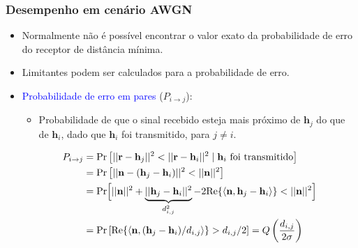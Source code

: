 \begin{frame}
	\frametitle{Desempenho em cenário AWGN}

	\begin{itemize}
	    \item Normalmente não é possível encontrar o valor exato da probabilidade de erro do receptor de distância mínima.
	    \item Limitantes podem ser calculados para a probabilidade de erro.
	    \item \textcolor{blue}{Probabilidade de erro em pares} ($P_{i\rightarrow j}$):
	    \begin{itemize}
		\item Probabilidade de que o sinal recebido esteja mais próximo de $\mathbf{h}_j$ do que de $\mathbf{h}_i$, dado que $\mathbf{h}_i$ foi transmitido, para $j\neq i$.
	    \end{itemize}
	    \begin{align*}
		P_{i\rightarrow j} &= \mathrm{Pr}\left[ || \mathbf{r} - \mathbf{h}_j ||^2 < || \mathbf{r} - \mathbf{h}_i ||^2 \mid \mathbf{h}_i \text{ foi transmitido} \right] \\
		&= \mathrm{Pr}\left[ || \mathbf{n} - (\mathbf{h}_j - \mathbf{h}_i) ||^2 < || \mathbf{n} ||^2 \right] \\
		&= \mathrm{Pr}\Bigl[ || \mathbf{n} ||^2 + \underbrace{|| \mathbf{h}_j - \mathbf{h}_i ||^2}_{d_{i,j}^2} - 2\mathrm{Re}\{ \langle \mathbf{n}, \mathbf{h}_j - \mathbf{h}_i \rangle \} < || \mathbf{n} ||^2 \Bigr] \\
		&= \mathrm{Pr}\left[ \mathrm{Re}\{ \langle \mathbf{n}, (\mathbf{h}_j - \mathbf{h}_i)/d_{i,j} \rangle \} > d_{i,j}/2 \right] = Q\left(\frac{d_{i,j}}{2\sigma} \right)
	    \end{align*}
	\end{itemize}
\end{frame}

